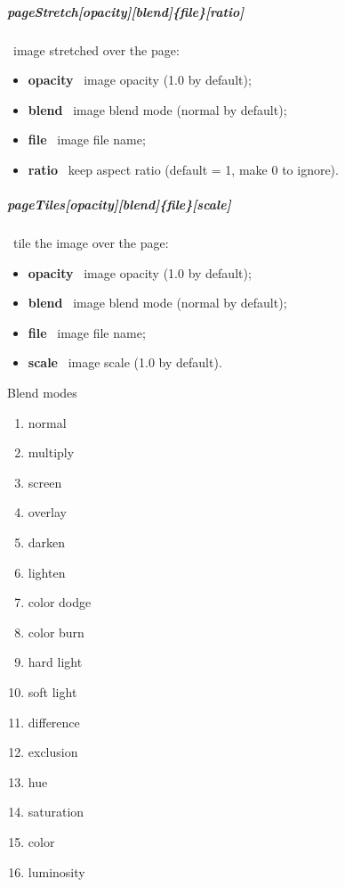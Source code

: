 \documentclass[english,12pt,openany,letterpaper]{book}
\begin{document}
\subparagraph{\bs pageStretch[opacity][blend]\{file\}[ratio]} \dash\ image stretched over the page:
\begin{itemize}
	\item \textbf{opacity} \dash\ image opacity (1.0 by default);
	\item \textbf{blend} \dash\ image blend mode (normal by default);
	\item \textbf{file} \dash\ image file name;
	\item \textbf{ratio} \dash\ keep aspect ratio (default = 1, make 0 to ignore).
\end{itemize}

\subparagraph{\bs pageTiles[opacity][blend]\{file\}[scale]} \dash\ tile the image over the page:
\begin{itemize}
	\item \textbf{opacity} \dash\ image opacity (1.0 by default);
	\item \textbf{blend} \dash\ image blend mode (normal by default);
	\item \textbf{file} \dash\ image file name;
	\item \textbf{scale} \dash\ image scale (1.0 by default).
\end{itemize}

\skipline

\begin{headerbox}{Blend modes}
\vspace*{-\baselineskip}\noindent\begin{multicols}{4}
	\begin{enumerate}
		\item normal
		\item multiply
		\item screen
		\item overlay
		\item darken
		\item lighten
		\item color dodge
		\item color burn
		\item hard light
		\item soft light
		\item difference
		\item exclusion
		\item hue
		\item saturation
		\item color
		\item luminosity
	\end{enumerate}
\end{multicols}
\vspace*{0.5ex-2\baselineskip}~
\end{headerbox}
\end{document}
